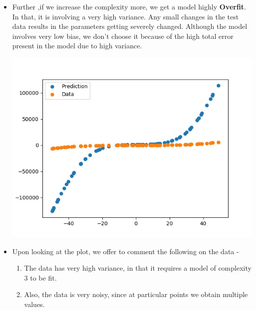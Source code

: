 \documentclass[11pt]{article}
\begin{document}
\begin{itemize}
\begin{center}
\end{center}
		\item Further ,if we increase the complexity more, we get a model highly \textbf{Overfit}. In that, it is involving a very high variance. Any small changes in the test data results in the parameters getting severely changed. Although the model involves very low bias, we don't choose it because of the high total error present in the model due to high variance.
		\begin{center}
	\hspace{-1.5cm}\includegraphics[scale=0.8]{../q2fig9.jpg}
\end{center}
		\item Upon looking at the plot, we offer to comment the following on the data - 
		\begin{enumerate}
			\item The data has very high variance, in that it requires a model of complexity 3 to be fit.
			\item Also, the data is very noisy, since at particular points we obtain multiple values. 
		\end{enumerate}
		
	\end{itemize}
\end{document}
